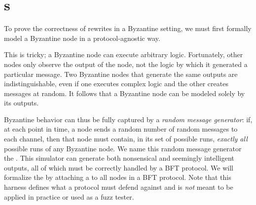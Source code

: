 \section{\randomSimulator{}s}
\label{sec:bft-formalism}
To prove the correctness of rewrites in a Byzantine setting, we must first formally model a Byzantine node in a protocol-agnostic way.

This is tricky; a Byzantine node can execute arbitrary logic.
Fortunately, other nodes only observe the output of the node, not the logic by which it generated a particular message.
Two Byzantine nodes that generate the same outputs are indistinguishable, even if one executes complex logic and the other creates messages at random.
It follows that a Byzantine node can be modeled solely by its outputs.

Byzantine behavior can thus be fully captured by a \emph{random message generator}: if, at each point in time, a node sends a random number of random messages to each channel, then that node must contain, in its set of possible runs, \emph{exactly all} possible runs of any Byzantine node.
We name this random message generator the \textbf{\randomSimulator{}}.
This simulator can generate both nonsensical and seemingly intelligent outputs, all of which must be correctly handled by a BFT protocol.
We will formalize the \randomSimulator{} by attaching a \textbf{\randomHarness{}} to all nodes in a BFT protocol.
Note that this harness defines what a protocol must defend against 
and is \emph{not} meant to be applied in practice or used as a fuzz tester.

